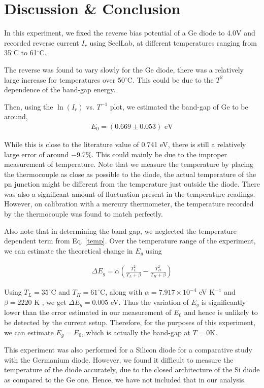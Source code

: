 \section{Discussion \& Conclusion}
In this experiment, we fixed the reverse bias potential of a Ge diode to 4.0V and recorded reverse current $I_r$ using SeelLab, at different temperatures ranging from 35$^\circ$C to 61$^\circ$C. 

The reverse was found to vary slowly for the Ge diode, there was a relatively large increase for temperatures over 50$^\circ$C. This could be due to the $T^2$ dependence of the band-gap energy.

Then, using the $\ln(I_r)$ vs. $T^{-1}$ plot, we estimated the band-gap of Ge to be around,
\begin{align*}
    \boxed{E_0 = (0.669 \pm 0.053) \text{ eV}}
\end{align*}

While this is close to the literature value of 0.741 eV, there is still a relatively large error of around $-$9.7\%. 
This could mainly be due to the improper measurement of temperature. Note that we measure the temperature by placing the thermocouple as close as possible to the diode, the actual temperature of the pn junction might be different from the temperature just outside the diode. There was also a significant amount of fluctuation present in the temperature readings.
However, on calibration with a mercury thermometer, the temperature recorded by the thermocouple was found to match perfectly.

Also note that in determining the band gap, we neglected the temperature dependent term from Eq. \ref{temp}. Over the temperature range of the experiment, we can estimate the theoretical change in $E_g$ using

\begin{align}
    \Delta E_g = \alpha \left(\frac{T_L^2}{T_L + \beta} - \frac{T_H^2}{T_H + \beta}\right)
\end{align}

Using $T_L = 35^\circ$C and $T_H = 61^\circ$C, along with $\alpha=7.917\times 10^{-4}$ eV K$^{-1}$ and $\beta=2220$ K \cite{varshni-1967}, we get $\Delta E_g = 0.005$ eV. Thus the variation of $E_g$ is significantly lower than the error estimated in our measurement of $E_0$ and hence is unlikely to be detected by the current setup. Therefore, for the purposes of this experiment, we can estimate $E_g = E_0$, which is actually the band-gap at $T=0$K.

This experiment was also performed for a Silicon diode for a comparative study with the Germanium diode. However, we found it difficult to measure the temperature of the diode accurately, due to the closed architecture of the Si diode as compared to the Ge one. Hence, we have not included that in our analysis.

